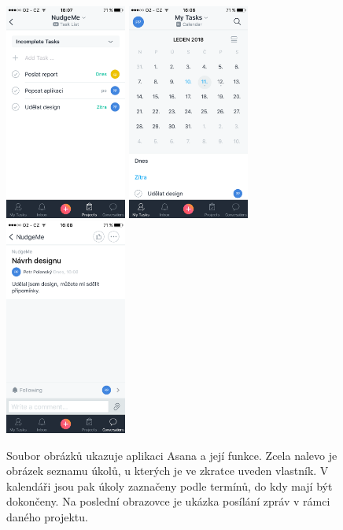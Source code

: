 \begin{figure}[H]
\centering
\includegraphics[width= 4cm]{obrazky-figures/IMG_0341}
\includegraphics[width= 4cm]{obrazky-figures/IMG_0340}
\includegraphics[width= 4cm]{obrazky-figures/IMG_0342}
\caption{Soubor obrázků ukazuje aplikaci Asana a její funkce. Zcela nalevo je obrázek seznamu úkolů, u kterých je ve zkratce uveden vlastník. V kalendáři jsou pak úkoly zaznačeny podle termínů, do kdy mají být dokončeny. Na poslední obrazovce je ukázka posílání zpráv v rámci daného projektu.}
\label{asana}
\end{figure}

